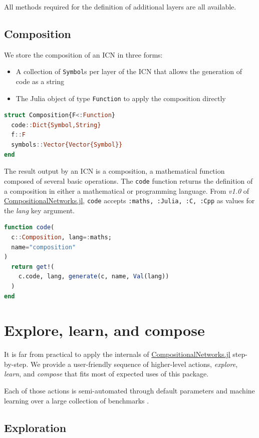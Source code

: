 \documentclass{juliacon}
\newcommand{\cnjl}{\href{https://github.com/JuliaConstraints/CompositionalNetworks.jl}{CompositionalNetworks.jl}\xspace}
\begin{document}
All methods required for the definition of additional layers are all available.

\subsection{Composition}
\label{subsec:composition}

We store the composition of an ICN in three forms:
\begin{itemize}
  \item A collection of \texttt{Symbol}s per layer of the ICN that allows the generation of code as a string
  \item The Julia object of type \texttt{Function} to apply the composition directly
\end{itemize}

\begin{lstlisting}[language = Julia]
struct Composition{F<:Function}
  code::Dict{Symbol,String}
  f::F
  symbols::Vector{Vector{Symbol}}
end
\end{lstlisting}

The result output by an ICN is a composition, a mathematical function composed of several basic operations. The \texttt{code} function returns the definition of a composition in either a mathematical or programming language. From \emph{v1.0} of \cnjl, \texttt{code} accepts \texttt{:maths, :Julia, :C, :Cpp} as values for the \emph{lang} key argument.

\begin{lstlisting}[language = Julia]
function code(
  c::Composition, lang=:maths;
  name="composition"
)
  return get!(
    c.code, lang, generate(c, name, Val(lang))
  )
end
\end{lstlisting}

\section{Explore, learn, and compose}
\label{sec:xlc}

It is far from practical to apply the internals of \cnjl step-by-step. We provide a user-friendly sequence of higher-level actions, \emph{explore}, \emph{learn}, and \emph{compose} that fits most of expected uses of this package.

Each of those actions is semi-automated through default parameters and machine learning over a large collection of benchmarks \cite{baffier2022interpretable}.

\subsection{Exploration}
\end{document}
